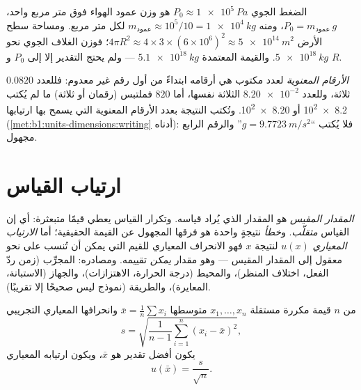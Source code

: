 \begin{example}\label{ex:b1:units-dimensions:atmosphere}
الضغط الجوي $P_0 \approx \qty{1e5}{Pa}$ هو وزن عمود الهواء فوق متر
مربع واحد، $P_0 = m_{\text{عمود}}\,g$، ومنه
$m_{\text{عمود}} \approx 10^5/10 = \qty{1e4}{kg}$ لكل متر مربع.
ومساحة سطح الأرض $4\pi R^2 \approx 4 \times 3 \times (6\times10^6)^2
\approx \qty{5e14}{m^2}$؛ فوزن الغلاف الجوي نحو
$\qty{5e18}{kg}$. والقيمة المعتمدة $\qty{5.1e18}{kg}$ --- ولم يحتج
التقدير إلا إلى $P_0$ و $R$.
\end{example}

\begin{definition}\label{def:b1:units-dimensions:sigfig}
\emph{الأرقام المعنوية} لعدد مكتوب هي أرقامه ابتداءً من أول رقم غير
معدوم: فللعدد $0.0820$ ثلاثة، وللعدد $\num{8.20e-2}$ الثلاثة نفسها،
أما $820$ فملتبس (رقمان أو ثلاثة) ما لم يُكتب \num{8.2e2} أو
\num{8.20e2}. وتُكتب النتيجة بعدد الأرقام المعنوية التي يسمح بها
ارتيابها (\cref{met:b1:units-dimensions:writing} أدناه): فلا يُكتب
``$g = \qty{9.7723}{m/s^2}$'' والرقم الرابع مجهول.
\end{definition}

\section{ارتياب القياس}

\begin{definition}\label{def:b1:units-dimensions:uncertainty}
\emph{المقدار المقيس} هو المقدار الذي يُراد قياسه. وتكرار القياس يعطي
قيمًا متبعثرة: أي إن القياس \emph{متقلّب}. و\emph{خطأ} نتيجةٍ واحدة
هو فرقها المجهول عن القيمة الحقيقية؛ أما \emph{الارتياب المعياري}
$u(x)$ لنتيجة $x$ فهو الانحراف المعياري للقيم التي يمكن أن تُنسب على
نحو معقول إلى المقدار المقيس --- وهو مقدار \emph{يمكن} تقييمه.
ومصادره: المجرِّب (زمن ردّ الفعل، اختلاف المنظر)، والمحيط (درجة
الحرارة، الاهتزازات)، والجهاز (الاستبانة، المعايرة)، والطريقة (نموذج
ليس صحيحًا إلا تقريبًا).
\end{definition}

\begin{proposition}\label{prop:b1:units-dimensions:typeA}
من $n$ قيمة مكررة مستقلة $x_1, \dots, x_n$ متوسطها
$\bar x = \frac1n \sum x_i$ وانحرافها المعياري التجريبي
\[
s = \sqrt{\frac{1}{n-1}\sum_{i=1}^n (x_i - \bar x)^2},
\]
يكون أفضل تقدير  هو $\bar x$، ويكون ارتيابه المعياري
\[
u(\bar x) = \frac{s}{\sqrt n} .
\]
\end{proposition}

